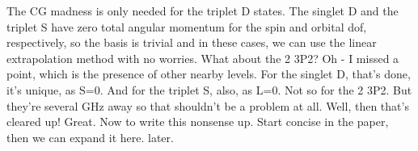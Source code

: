	The CG madness is only needed for the triplet D states.
	The singlet D and the triplet S have zero total angular momentum for the spin and orbital dof, respectively, so the basis is trivial and in these cases, we can use the linear extrapolation method with no worries.
	What about the 2 3P2? Oh - I missed a point, which is the presence of other nearby levels.
	For the singlet D, that's done, it's unique, as S=0.
	And for the triplet S, also, as L=0.
	 Not so for the 2 3P2.
	But they're several GHz away so that shouldn't be a problem at all.
	Well, then that's cleared up! Great.
	Now to write this nonsense up.
	Start concise in the paper, then we can expand it here.
	later.

			




